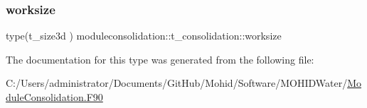 \mbox{\label{structmoduleconsolidation_1_1t__consolidation_a6b0833498a1e5bc6694266bece2f3dc6}} 
\subsubsection{\texorpdfstring{worksize}{worksize}}
{\footnotesize\ttfamily type(t\+\_\+size3d ) moduleconsolidation\+::t\+\_\+consolidation\+::worksize\hspace{0.3cm}{\ttfamily [private]}}



The documentation for this type was generated from the following file\+:\begin{DoxyCompactItemize}
\item 
C\+:/\+Users/administrator/\+Documents/\+Git\+Hub/\+Mohid/\+Software/\+M\+O\+H\+I\+D\+Water/\mbox{\hyperlink{_module_consolidation_8_f90}{Module\+Consolidation.\+F90}}\end{DoxyCompactItemize}
